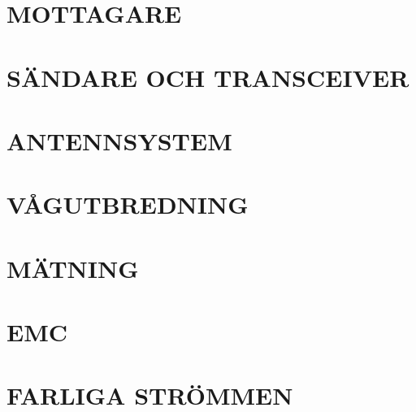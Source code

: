 \documentclass[a4paper,twoside,twocolumn,openright]{book}
\begin{document}
\chapter{MOTTAGARE}

\cleardoublepage

\cleardoublepage

\cleardoublepage

\cleardoublepage

\cleardoublepage

\cleardoublepage

\cleardoublepage

\cleardoublepage


\chapter{SÄNDARE OCH TRANSCEIVER}

\cleardoublepage


\chapter{ANTENNSYSTEM}

\cleardoublepage

\cleardoublepage

\cleardoublepage

\cleardoublepage

\cleardoublepage


\chapter{VÅGUTBREDNING}

\cleardoublepage

\cleardoublepage

\cleardoublepage

\cleardoublepage


\chapter{MÄTNING}

\cleardoublepage


\chapter{EMC}

\cleardoublepage

\cleardoublepage

\cleardoublepage


\chapter{FARLIGA STRÖMMEN}

\cleardoublepage

\cleardoublepage

\cleardoublepage

\end{document}
